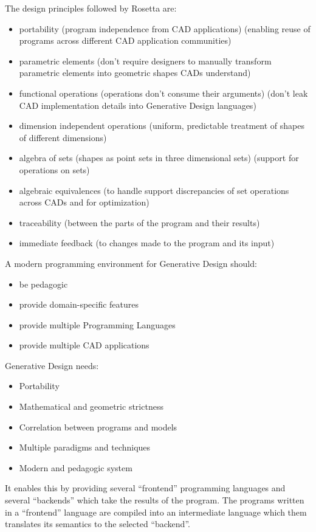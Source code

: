 \documentclass{./llncs2e/llncs}
\begin{document}
	The design principles followed by Rosetta are:
	\begin{itemize}
		\item portability (program independence from CAD applications) (enabling reuse of programs across different CAD application communities)
		\item parametric elements (don't require designers to manually transform parametric elements into geometric shapes CADs understand)
		\item functional operations (operations don't consume their arguments) (don't leak CAD implementation details into Generative Design languages)
		\item dimension independent operations (uniform, predictable treatment of shapes of different dimensions)
		\item algebra of sets (shapes as point sets in three dimensional sets) (support for operations on sets)
		\item algebraic equivalences (to handle support discrepancies of set operations across CADs and for optimization)
		\item traceability (between the parts of the program and their results)
		\item immediate feedback (to changes made to the program and its input)
	\end{itemize}

	A modern programming environment for Generative Design should:
	\begin{itemize}
		\item be pedagogic
		\item provide domain-specific features
		\item provide multiple Programming Languages
		\item provide multiple CAD applications
	\end{itemize}

	Generative Design needs:
	\begin{itemize}
		\item Portability
		\item Mathematical and geometric strictness
		\item Correlation between programs and models
		\item Multiple paradigms and techniques
		\item Modern and pedagogic system
	\end{itemize}

	It enables this by providing several ``frontend'' programming languages and several ``backends'' which take the results of the program. The programs written in a ``frontend'' language are compiled into an intermediate language which them translates its semantics to the selected ``backend''.
\end{document}
